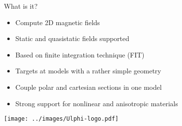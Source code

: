 %
%
%
%
%

\begin{frame}{What is it?}
  \begin{itemize}
  \item Compute 2D magnetic fields
  \item Static and quasistatic fields supported
  \item Based on finite integration technique (FIT)
  \item Targets at models with a rather simple geometry
  \item Couple polar and cartesian sections in one model
  \item Strong support for nonlinear and anisotropic materials
  \end{itemize}
  \vfill
  \centering
  \texttt{[image: ../images/Ulphi-logo.pdf]}
\end{frame}

